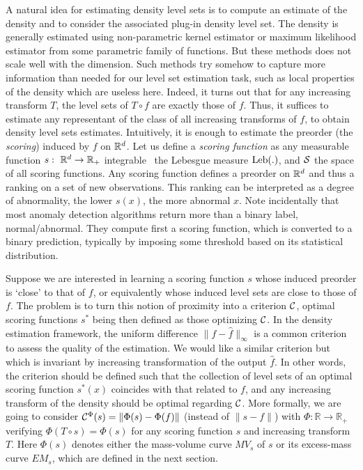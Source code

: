 



A natural idea for estimating density level sets is to compute an estimate of the density and to consider the associated plug-in density level set.
The density is generally estimated using non-parametric kernel estimator or maximum likelihood estimator from some parametric family of functions. But these methods does not scale well with the dimension. Such methods try somehow to capture more information than needed for our level set estimation task, such as local properties of the density which are useless here. Indeed, it turns out that for any increasing transform $T$, the level sets of $T\circ f$ are exactly those of $f$. Thus, it suffices to estimate any representant of the class of all increasing transforms of $f$, to obtain density level sets estimates. Intuitively, it is enough to estimate the preorder (the \emph{scoring}) induced by $f$ on $\rset^d$. Let us define a \emph{scoring function} as any measurable function $s:~\rset^d \to \rset_+$ integrable \wrt~the Lebesgue measure $\leb(.)$, and $\S$ the space of all scoring functions.
Any scoring function defines a preorder on $\rset^d$ and thus a ranking on a set of new observations. This ranking can be interpreted as a degree of abnormality, the lower $s(x)$, the more abnormal $x$. Note incidentally that most anomaly detection algorithms return more than a binary label, normal/abnormal. They compute first a scoring function, which is converted to a binary prediction, typically by imposing some threshold based on its statistical distribution.

Suppose we are interested in learning a scoring function $s$ whose induced preorder is `close' to that of $f$, or equivalently whose induced level sets are close to those of $f$. The problem is to turn this notion of proximity into a criterion $\crit$, optimal scoring functions $s^*$ being then defined as those optimizing $\crit$. In the density estimation framework, the uniform difference $\|f - \hat f\|_\infty$ is a common criterion to assess the quality of the estimation. We would like a similar criterion but which is invariant by increasing transformation of the output $\hat f$. In other words, the criterion should be defined such that the collection of level sets of an optimal scoring function $s^*(x)$ coincides with that related to $f$, and any increasing transform of the density should be optimal regarding $\crit$.
More formally, we are going to consider $\crit^{\Phi}(s) = \| \Phi(s) - \Phi(f) \|$ (instead of $\|s - f\|$) %
with $\Phi: \mathbb{R} \to \mathbb{R}_+$ verifying $\Phi(T \circ s) = \Phi(s)$ 
for any scoring function $s$ and increasing transform $T$. Here $\Phi(s)$ denotes either the mass-volume curve $MV_s$ of $s$ or its excess-mass curve $EM_s$, which are defined in the next section.  



